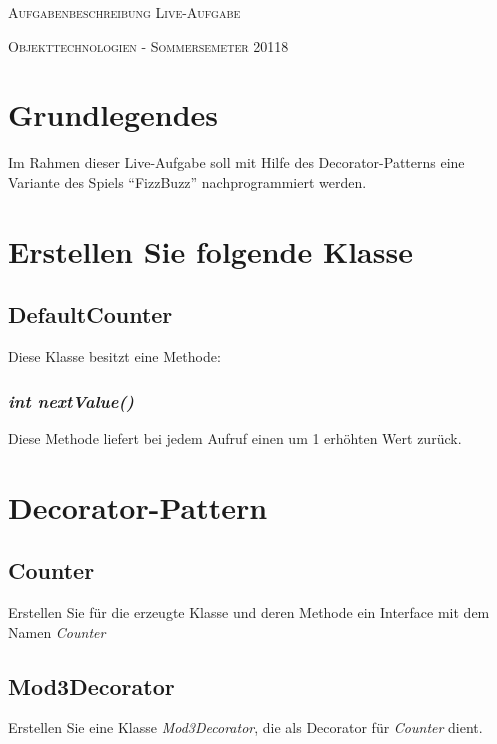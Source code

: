 \documentclass[oneside,a4paper]{scrartcl}
\author{Johannes Schneider}
\begin{document}
\centerline{\textsc{\LARGE Aufgabenbeschreibung Live-Aufgabe}}

\vspace{.5pc}
\centerline{\textsc{\large Objekttechnologien - Sommersemeter 20118}}
\vspace{2pc}



\section{Grundlegendes}

Im Rahmen dieser Live-Aufgabe soll mit Hilfe des Decorator-Patterns eine Variante des Spiels \enquote{FizzBuzz} nachprogrammiert werden.


\section{Erstellen Sie folgende Klasse}

\subsection{DefaultCounter}

Diese Klasse besitzt eine Methode:

\subsubsection{\emph{int nextValue()}}

Diese Methode liefert bei  jedem Aufruf
einen um 1 erhöhten Wert zurück.



\section{Decorator-Pattern}

\subsection{Counter}

Erstellen Sie für die erzeugte Klasse und deren Methode ein Interface mit dem Namen \emph{Counter}


\subsection{Mod3Decorator}
Erstellen Sie eine Klasse \emph{Mod3Decorator}, die als Decorator für \emph{Counter} dient.
\end{document}
